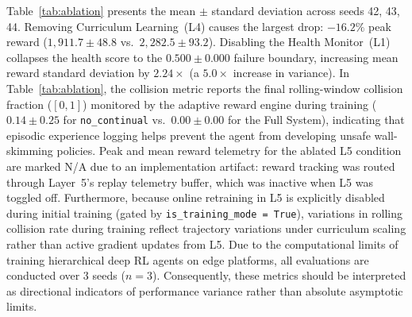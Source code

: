 \documentclass[conference]{IEEEtran}
\begin{document}
Table~\ref{tab:ablation} presents the mean $\pm$ standard deviation across seeds 42, 43, 44.
Removing Curriculum Learning~(L4) causes the largest drop: $-16.2\%$ peak reward ($1{,}911.7 \pm 48.8$ vs.\ $2{,}282.5 \pm 93.2$).
Disabling the Health Monitor~(L1) collapses the health score to the $0.500 \pm 0.000$ failure boundary, increasing mean reward standard deviation by $2.24\times$ (a $5.0\times$ increase in variance).
In Table~\ref{tab:ablation}, the collision metric reports the final rolling-window collision fraction ($[0, 1]$) monitored by the adaptive reward engine during training ($0.14 \pm 0.25$ for \texttt{no\_continual} vs.\ $0.00 \pm 0.00$ for the Full System), indicating that episodic experience logging helps prevent the agent from developing unsafe wall-skimming policies. Peak and mean reward telemetry for the ablated L5 condition are marked N/A due to an implementation artifact: reward tracking was routed through Layer~5's replay telemetry buffer, which was inactive when L5 was toggled off. Furthermore, because online retraining in L5 is explicitly disabled during initial training (gated by \texttt{is\_training\_mode = True}), variations in rolling collision rate during training reflect trajectory variations under curriculum scaling rather than active gradient updates from L5.
Due to the computational limits of training hierarchical deep RL agents on edge platforms, all evaluations are conducted over 3 seeds ($n=3$). Consequently, these metrics should be interpreted as directional indicators of performance variance rather than absolute asymptotic limits.

\begin{table}[t]
\caption{3-Seed Ablation Matrix (Mean $\pm$ SD, 50K steps/run; Train.\ Col.\ Frac.\ denotes rolling-window collision fraction $[0, 1]$ during training)}
\label{tab:ablation}
\centering
{}
\end{table}
\end{document}

